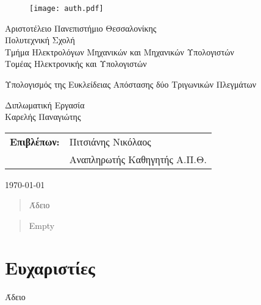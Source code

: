\begin{titlepage}

\begin{figure}[H]
  \begin{center}
    \texttt{[image: auth.pdf]}
    \label{fig:cover_auth_logo}
  \end{center}
\end{figure}

\centering
\Large Αριστοτέλειο Πανεπιστήμιο Θεσσαλονίκης\\
\Large Πολυτεχνική Σχολή\\
\large Τμήμα Ηλεκτρολόγων Μηχανικών και Μηχανικών Υπολογιστών\\
\large Τομέας Ηλεκτρονικής και Υπολογιστών

\vspace{\fill}

\LARGE Υπολογισμός της Ευκλείδειας Απόστασης δύο Τριγωνικών Πλεγμάτων

\vspace{\fill}

\Large Διπλωματική Εργασία\\
\Large Καρελής Παναγιώτης

\vspace{\fill}
\raggedright

\begin{tabular}{ll}
\textbf{Επιβλέπων:} & Πιτσιάνης Νικόλαος\\
 & Αναπληρωτής Καθηγητής Α.Π.Θ.\\
\end{tabular}

\centering
\vspace{\fill}
\today

\end{titlepage}

\begin{abstract}
Άδειο
\end{abstract}

\begin{abstract}
Empty
\end{abstract}

\thispagestyle{empty}


\section*{Ευχαριστίες}
\thispagestyle{empty}

Άδειο

\clearpage
